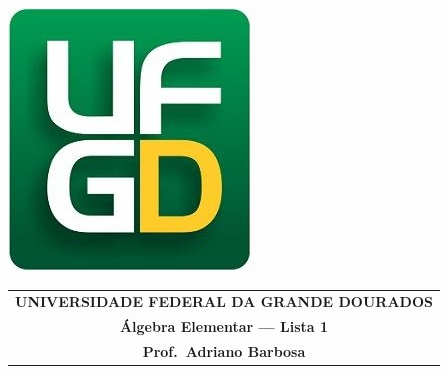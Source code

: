 \documentclass[a4paper,5pt]{amsbook}
\begin{document}
\thispagestyle{empty}
\pagestyle{empty}
\begin{minipage}[h]{0.14\textwidth}
	\includegraphics[scale=0.24]{../ufgd.png}
\end{minipage}
\begin{minipage}[h]{\textwidth}
\begin{tabular}{c}
{{\bf UNIVERSIDADE FEDERAL DA GRANDE DOURADOS}}\\
{{\bf \'Algebra Elementar --- Lista 1}}\\
{{\bf Prof.\ Adriano Barbosa}}\\
\end{tabular}
\vspace{-0.45cm}
%
\end{minipage}

\end{document}
